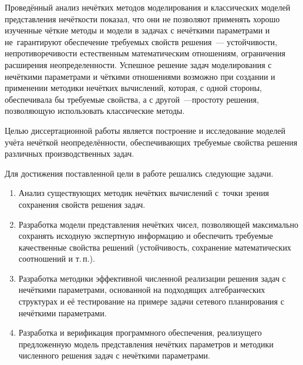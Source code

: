 Проведённый анализ нечётких методов моделирования и классических моделей представления нечёткости показал, что они не позволяют применять хорошо изученные чёткие методы и модели в задачах с нечёткими параметрами и не~гарантируют обеспечение требуемых свойств решения~--- устойчивости, непротиворечивости естественным математическим отношениям, ограничения расширения неопределенности. Успешное решение задач моделирования с нечёткими параметрами и чёткими отношениями возможно при создании и применении методики нечётких вычислений, которая, с одной стороны, обеспечивала бы требуемые свойства, а с другой~---простоту решения, позволяющую использовать классические методы.

Целью диссертационной работы является построение и исследование моделей учёта нечёткой неопределённости, обеспечивающих требуемые свойства решения различных производственных задач.

Для достижения поставленной цели в работе решались следующие задачи.
\begin{enumerate}
  \item Анализ существующих методик нечётких вычислений с~точки зрения сохранения свойств решения задач.
  \item Разработка модели представления нечётких чисел, позволяющей максимально сохранять исходную экспертную информацию и обеспечить требуемые качественные свойства решений (устойчивость, сохранение математических соотношений и т.\,п.).
  \item Разработка методики эффективной численной реализации решения задач с нечёткими параметрами, основанной на подходящих алгебраических структурах и её тестирование на примере задачи сетевого планирования с нечёткими параметрами.
  \item Разработка и верификация программного обеспечения, реализущего предложенную модель представления нечётких параметров и методики численного решения задач с нечёткими параметрами.
\end{enumerate}